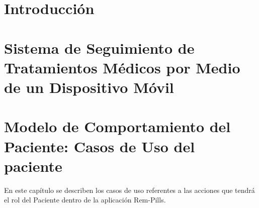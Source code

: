 \documentclass[12pt]{book}
\begin{document}
\renewcommand{\listtablename}{Índice de tablas}
\renewcommand{\tablename}{Tabla} 

\thispagestyle{empty}



 

\frontmatter
\tableofcontents
\listoffigures
\mainmatter

 \hideControlVersion
 
\chapter{Introducción}\label{chp:introduccion}
    
\chapter{Sistema de Seguimiento de Tratamientos Médicos por Medio de un Dispositivo Móvil}

\chapter{Modelo de Comportamiento del Paciente: Casos de Uso del paciente \label{chp:modeloComportamientoPaciente}}
\newpage
En este capítulo se describen los casos de uso referentes a las acciones que tendrá el rol del Paciente dentro de la aplicación Rem-Pills. \bigskip
\end{document}
